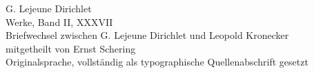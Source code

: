 \documentclass[11pt]{article}
\begin{document}
\begin{center}
{\Large G. Lejeune Dirichlet}\\[0.3em]
{\large Werke, Band II, XXXVII}\\[0.8em]
{\LARGE Briefwechsel zwischen G. Lejeune Dirichlet und Leopold Kronecker}\\[0.4em]
{\large mitgetheilt von Ernst Schering}\\[0.7em]
{\small Originalsprache, vollständig als typographische Quellenabschrift gesetzt}
\end{center}

\end{document}
